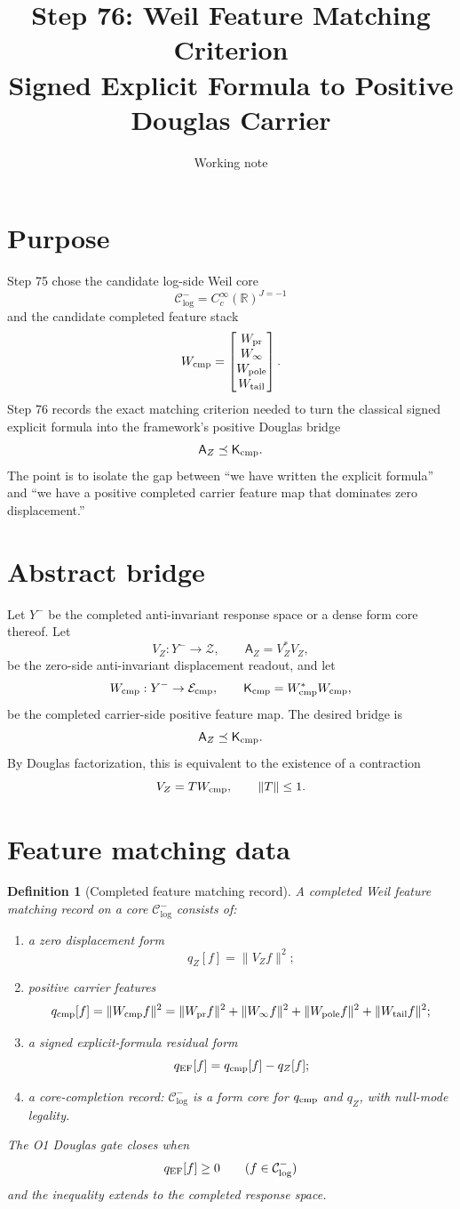 \documentclass[11pt]{article}
\title{Step 76: Weil Feature Matching Criterion\\
Signed Explicit Formula to Positive Douglas Carrier}
\author{Working note}
\date{}
\newtheorem{definition}{Definition}
\newcommand{\AZ}{\mathsf A_Z}
\newcommand{\Kcmp}{\mathsf K_{\rm cmp}}
\newcommand{\Ccore}{\mathcal C^-_{\log}}
\newcommand{\Yminus}{Y^-}
\newcommand{\Wcmp}{W_{\rm cmp}}
\newcommand{\Wpr}{W_{\rm pr}}
\newcommand{\Winfty}{W_\infty}
\newcommand{\Wpole}{W_{\rm pole}}
\newcommand{\Wtail}{W_{\rm tail}}
\begin{document}
\maketitle

\section{Purpose}
Step 75 chose the candidate log-side Weil core
\[
\Ccore=C_c^\infty(\mathbb R)^{J=-1}
\]
and the candidate completed feature stack
\[
\Wcmp=
\begin{bmatrix}
\Wpr\\ \Winfty\\ \Wpole\\ \Wtail
\end{bmatrix}.
\]
Step 76 records the exact matching criterion needed to turn the classical signed explicit formula into the framework's positive Douglas bridge
\[
\AZ\preceq \Kcmp.
\]
The point is to isolate the gap between ``we have written the explicit formula'' and ``we have a positive completed carrier feature map that dominates zero displacement.''

\section{Abstract bridge}
Let \(\Yminus\) be the completed anti-invariant response space or a dense form core thereof. Let
\[
V_Z:\Yminus\to \mathcal Z,
\qquad \AZ=V_Z^*V_Z,
\]
be the zero-side anti-invariant displacement readout, and let
\[
\Wcmp:\Yminus\to \mathcal E_{\rm cmp},
\qquad \Kcmp=\Wcmp^*\Wcmp,
\]
be the completed carrier-side positive feature map. The desired bridge is
\[
\AZ\preceq\Kcmp.
\]
By Douglas factorization, this is equivalent to the existence of a contraction
\[
V_Z=T\Wcmp,
\qquad \|T\|\le 1.
\]

\section{Feature matching data}
\begin{definition}[Completed feature matching record]
A completed Weil feature matching record on a core \(\Ccore\) consists of:
\begin{enumerate}[label=(M\arabic*)]
\item a zero displacement form
\[
q_Z[f]=\|V_Z f\|^2;
\]
\item positive carrier features
\[
q_{\rm cmp}[f]
=\|\Wcmp f\|^2
=\|\Wpr f\|^2+\|\Winfty f\|^2+\|\Wpole f\|^2+\|\Wtail f\|^2;
\]
\item a signed explicit-formula residual form
\[
q_{\rm EF}[f]=q_{\rm cmp}[f]-q_Z[f];
\]
\item a core-completion record: \(\Ccore\) is a form core for \(q_{\rm cmp}\) and \(q_Z\), with null-mode legality.
\end{enumerate}
The O1 Douglas gate closes when
\[
q_{\rm EF}[f]\ge0\qquad(f\in\Ccore)
\]
and the inequality extends to the completed response space.
\end{definition}
\end{document}
